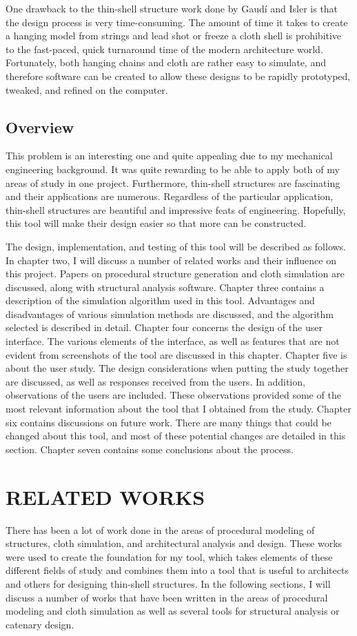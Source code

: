 \documentclass{thesis}
\begin{document}
One drawback to the thin-shell structure work done by Gaud\'{i} and Isler is that the design process is very time-consuming.  The amount of time
it takes to create a hanging model from strings and lead shot or freeze a cloth shell is prohibitive to the fast-paced, quick turnaround time of
the modern architecture world.  Fortunately, both hanging chains and cloth are rather easy to simulate, and therefore software can be created to
allow these designs to be rapidly prototyped, tweaked, and refined on the computer.

\section{Overview}
This problem is an interesting one and quite appealing due to my mechanical engineering background.  It
was quite rewarding to be able to apply both of my areas of study in one project.  Furthermore, thin-shell
structures are fascinating and their applications are numerous.  Regardless of the particular application,
thin-shell structures are beautiful and impressive feats of engineering.  Hopefully, this tool will make
their design easier so that more can be constructed.

The design, implementation, and testing of this tool will be described as follows.
In chapter two, I will discuss a number of related works and their influence on this project.  Papers on
procedural structure generation and cloth simulation are discussed, along with structural analysis software.
Chapter three contains a description of the simulation algorithm used in this tool.  Advantages and
disadvantages of various simulation methods are discussed, and the algorithm selected is described in detail.
Chapter four concerns the design of the user interface.  The various elements of the interface, as well as
features that are not evident from screenshots of the tool are discussed in this chapter.  Chapter five is
about the user study.  The design considerations when putting the study together are discussed, as well as
responses received from the users.  In addition, observations of the users are included.  These observations
provided some of the most relevant information about the tool that I obtained from the study.  Chapter six
contains discussions on future work.  There are many things that could be changed about this tool, and most
of these potential changes are detailed in this section.  Chapter seven contains some conclusions about the
process.

\clearpage
\chapter{RELATED WORKS}
There has been a lot of work done in the areas of procedural modeling of structures, cloth simulation, and
architectural analysis and design.  These works were used to create the foundation for my tool, which takes
elements of these different fields of study and combines them into a tool that is useful to architects and
others for designing thin-shell structures.  In the following sections, I will discuss a number of works
that have been written in the areas of procedural modeling and cloth simulation as well as several tools
for structural analysis or catenary design.
\end{document}
